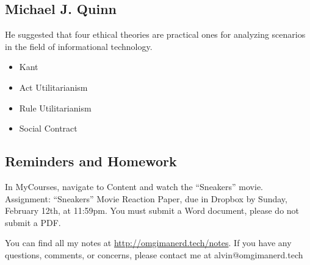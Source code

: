 \documentclass{article}
\begin{document}
\subsection*{Michael J. Quinn}
He suggested that four ethical theories are practical ones for analyzing
scenarios in the field of informational technology.
\begin{itemize}
  \item Kant
  \item Act Utilitarianism
  \item Rule Utilitarianism
  \item Social Contract
\end{itemize}

\subsection*{Reminders and Homework}
In MyCourses, navigate to Content and watch the ``Sneakers'' movie. \\
Assignment: ``Sneakers'' Movie Reaction Paper, due in Dropbox by Sunday,
February 12th, at 11:59pm.
You must submit a Word document, please do not submit a PDF.

\begin{center}
  You can find all my notes at \url{http://omgimanerd.tech/notes}. If you have
  any questions, comments, or concerns, please contact me at
  alvin@omgimanerd.tech
\end{center}
\end{document}
